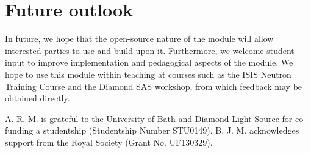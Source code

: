 \documentclass[amsmath,amssymb,twocolumn,superscriptaddress,aps,prl]{revtex4-1}
\begin{document}
\section{Future outlook}

In future, we hope that the open-source nature of the module will allow interested parties to use and build upon it.
Furthermore, we welcome student input to improve implementation and pedagogical aspects of the module.
We hope to use this module within teaching at courses such as the ISIS Neutron Training Course and the Diamond SAS workshop, from which feedback may be obtained directly.

\begin{acknowledgements}
A. R. M. is grateful to the University of Bath and Diamond Light Source for co-funding a studentship (Studentship Number STU0149).
B. J. M. acknowledges support from the Royal Society (Grant No. UF130329).
\end{acknowledgements}


\end{document}
